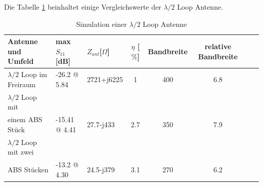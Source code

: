
Die Tabelle \ref{tab:Evaluation_Vergeich_Loop_Antennen_Lmabda05} beinhaltet einige Vergleichswerte der $\lambda/2$ Loop Antenne.
\begin{table}[!h]
  \centering
  \begin{tabular}{p{4cm} p{2cm} l  c c c c r} 
  \toprule 
  Antenne und Umfeld             	& max $S_{11}$[dB]		& $Z_{ant}$[$\Omega$] 	& $\eta$ [$\%$] & Bandbreite & relative Bandbreite\\ 
  \midrule
 $\lambda/2$ Loop im Freiraum    		&	-26.2 @ 5.84	&  	2721+j6225			&   1	&	400 & 6.8\\          					   		
$\lambda/2$ Loop mit \\einem ABS Stück &    -15.41 @ 4.41 	&	27.7-j433		&	2.7	&	350 & 7.9 \\
$\lambda/2$ Loop mit zwei \\ABS Stücken &    -13.2 @ 4.30    &	24.5-j379		&	3.1	&	270 & 6.2\\
 \bottomrule
  \end{tabular}
  \caption{Simulation einer $\lambda/2$ Loop Antenne }
  \label{tab:Evaluation_Vergeich_Loop_Antennen_Lmabda05}
\end{table}

